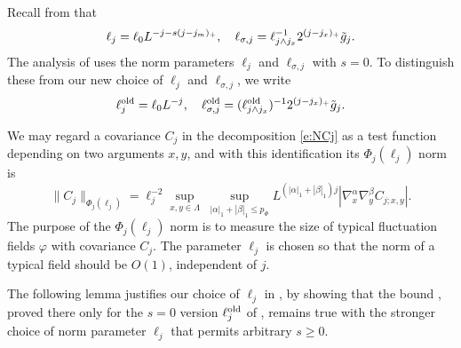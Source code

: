 Recall from  that
\begin{equation}
\label{e:elldef}
\ell_j
	=
\ell_0 L^{-j - s (j - j_m)_+}, \quad
\ell_{\sigma,j}
	=
\ell_{j \wedge j_{x}}^{-1} 2^{(j - j_{x})_+} \tilde{g}_j.
\end{equation}
The analysis of \cite{BS-rg-IE,BS-rg-step} uses the norm parameters $\ell_j$ and $\ell_{\sigma,j}$ with $s = 0$.
To distinguish these from our
new choice  of $\ell_j$ and $\ell_{\sigma,j}$, we write
\begin{equation}
\label{e:ell-old}
    \ell_j^{\mathrm{old}} = \ell_0 L^{-j},
    \quad
    \ell_{\sigma,j}^{\mathrm{old}}  =
    (\ell_{j \wedge j_{x}}^{\rm old})^{-1}2^{(j - j_{x})_+}\tilde{g}_j.
\end{equation}

We may regard a covariance $C_j$ in the decomposition \eqref{e:NCj}
as a test function depending on
two arguments $x,y$, and with this identification its $\Phi_j(\ell_j)$
norm is
\begin{equation}
    \label{e:Phinorm}
    \|C_j\|_{\Phi_{j}(\ell_j)}  =
    \ell_j^{-2}
    \sup_{x,y\in \Lambda}
    \;
    \sup_{|\alpha|_1 + |\beta|_1 \le p_\Phi}
    L^{(|\alpha|_1+  |\beta|_1)j}
    |\nabla_x^{\alpha} \nabla_y^{\beta} C_{j;x,y}|.
\end{equation}
The purpose of the $\Phi_j(\ell_j)$ norm is to measure the size of typical
fluctuation fields $\varphi$ with covariance $C_j$.
The parameter $\ell_j$ is chosen so that the norm of a typical field should
be $O(1)$, independent of $j$.

The following lemma justifies our choice of $\ell_j$
in , by showing that the
bound \cite[\eqref{IE-e:CLbd}]{BS-rg-IE}, proved there only for the $s=0$ version
$\ell_j^{\mathrm{old}}$ of ,
remains true with the stronger
choice of norm parameter $\ell_j$ that permits arbitrary $s \ge 0$.


